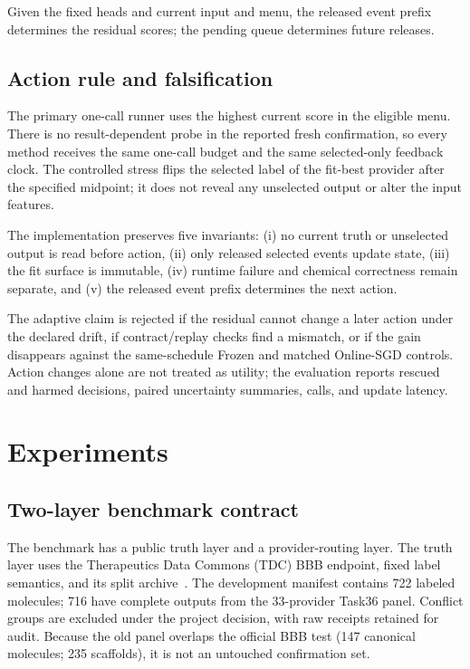 \documentclass[sigconf,anonymous]{aamas}
\begin{document}
Given the fixed heads and current input and menu, the released event prefix determines the residual scores; the pending queue determines future releases.

\subsection{Action rule and falsification}
The primary one-call runner uses the highest current score in the eligible menu. There is no result-dependent probe in the reported fresh confirmation, so every method receives the same one-call budget and the same selected-only feedback clock. The controlled stress flips the selected label of the fit-best provider after the specified midpoint; it does not reveal any unselected output or alter the input features.

The implementation preserves five invariants: (i) no current truth or unselected output is read before action, (ii) only released selected events update state, (iii) the fit surface is immutable, (iv) runtime failure and chemical correctness remain separate, and (v) the released event prefix determines the next action.

The adaptive claim is rejected if the residual cannot change a later action under the declared drift, if contract/replay checks find a mismatch, or if the gain disappears against the same-schedule Frozen and matched Online-SGD controls. Action changes alone are not treated as utility; the evaluation reports rescued and harmed decisions, paired uncertainty summaries, calls, and update latency.

\section{Experiments}
\subsection{Two-layer benchmark contract}
The benchmark has a public truth layer and a provider-routing layer. The truth layer uses the Therapeutics Data Commons (TDC) BBB endpoint, fixed label semantics, and its split archive~\cite{huang2021tdc}. The development manifest contains 722 labeled molecules; 716 have complete outputs from the 33-provider Task36 panel. Conflict groups are excluded under the project decision, with raw receipts retained for audit. Because the old panel overlaps the official BBB test (147 canonical molecules; 235 scaffolds), it is not an untouched confirmation set.
\end{document}
